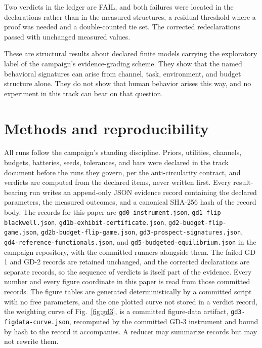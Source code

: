 \documentclass[aps,pre,reprint,nofootinbib]{revtex4-2}
\begin{document}
Two verdicts in the ledger are FAIL, and both failures were located
in the declarations rather than in the measured structures, a
residual threshold where a proof was needed and a double-counted tie
set.  The corrected redeclarations passed with
unchanged measured values.

These are structural results about declared finite models carrying
the exploratory label of the campaign's evidence-grading scheme.
They show that the named behavioral signatures can arise from
channel, task, environment, and budget structure alone.  They do not
show that human behavior arises this way, and no experiment in this
track can bear on that question.

\section{Methods and reproducibility}
\label{sec:methods}

All runs follow the campaign's standing discipline.  Priors,
utilities, channels, budgets, batteries, seeds, tolerances, and bars
were declared in the track document before the runs they govern, per
the anti-circularity contract, and verdicts are computed from the
declared items, never written first.  Every result-bearing run
writes an append-only JSON evidence record containing the declared
parameters, the measured outcomes, and a canonical SHA-256 hash of
the record body.  The records for this paper are
\texttt{gd0-instrument.json},
\texttt{gd1-flip-blackwell.json},
\texttt{gd1b-exhibit-certificate.json},
\texttt{gd2-budget-flip-game.json},
\texttt{gd2b-budget-flip-game.json},
\texttt{gd3-prospect-signatures.json},
\texttt{gd4-reference-functionals.json}, and
\texttt{gd5-budgeted-equilibrium.json} in the campaign repository,
with the committed runners alongside them.  The failed GD-1 and GD-2
records are retained unchanged, and the corrected declarations are
separate records, so the sequence of verdicts is itself part of the
evidence.  Every number and every figure coordinate in this paper is
read from those committed records.  The figure tables are generated
deterministically by a committed script with no free parameters, and
the one plotted curve not stored in a verdict record, the weighting
curve of Fig.~\ref{fig:gd3}, is a committed figure-data artifact,
\texttt{gd3-figdata-curve.json}, recomputed by the committed GD-3
instrument and bound by hash to the record it accompanies.  A
reducer may summarize records but
may not rewrite them.
\end{document}
